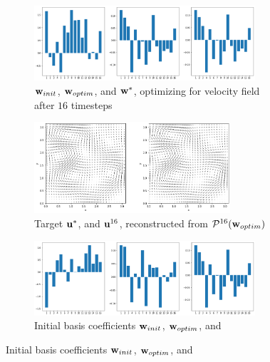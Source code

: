 \begin{figure}
  \centering
  \begin{subfigure}{\textwidth}
    \centering
    \includegraphics[width=0.9\textwidth]{figures/finding-initial-velocities/t_16_coefficients.png}
    \caption{$\vb{w}_{init}$, $\vb{w}_{optim}$, and
    $\vb{w}^*$, optimizing for velocity field after $16$ timesteps}
    \label{fig:16-timesteps-coeffs}
  \end{subfigure}\par\medskip
  \begin{subfigure}{\textwidth}
    \centering
    \includegraphics[width=0.8\textwidth]{figures/finding-initial-velocities/t_16_velocities.png}
    \caption{Target $\vb{u}^*$, and $\vb{u}^{16}$, reconstructed from
      $\mathcal{P}^{16}(\vb{w}_{optim})$\\}
    \label{fig:16-timesteps-vel}
  \end{subfigure}\par\medskip
  \begin{subfigure}{\textwidth}
    \centering
    \includegraphics[width=0.9\textwidth]{figures/finding-initial-velocities/t_100_coefficients.png}
    \caption{Initial basis coefficients $\vb{w}_{init}$, $\vb{w}_{optim}$, and
}
\end{subfigure}
\end{figure}
